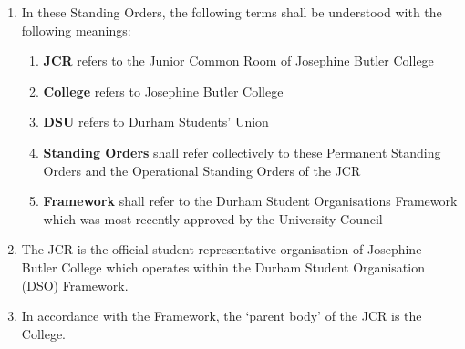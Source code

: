 
\begin{enumerate}
    \item In these Standing Orders, the following terms shall be understood with the following meanings:
    \begin{enumerate}
        \item \textbf{JCR} refers to the Junior Common Room of Josephine Butler College
        \item \textbf{College} refers to Josephine Butler College
        \item \textbf{DSU} refers to Durham Students’ Union 
        \item \textbf{Standing Orders} shall refer collectively to these Permanent Standing Orders and the Operational Standing Orders of the JCR
        \item \textbf{Framework} shall refer to the Durham Student Organisations Framework which was most recently approved by the University Council
    \end{enumerate}
    \item The JCR is the official student representative organisation of Josephine Butler College which operates within the Durham Student Organisation (DSO) Framework.
    \item In accordance with the Framework, the `parent body' of the JCR is the College.
\end{enumerate}
